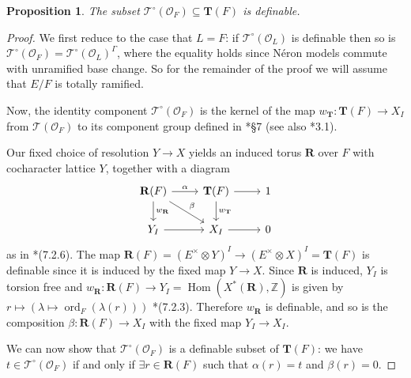 \documentclass{amsart}
\newcommand{\Z}{{\mathbb Z}}
\newcommand{\ri}{\mathcal{O}}
\DeclareMathOperator{\ord}{ord}
\DeclareMathOperator{\Hom}{Hom}
\newcommand{\bT}{\mathbf {T}}
\newcommand{\bR}{\mathbf{R}}
\newcommand{\Ner}[1]{\mathcal{#1}}
\newcommand{\NerC}[1]{\mathcal{#1}^\circ}
\theoremstyle{plain}
\newtheorem{prop}[thm]{Proposition}
\theoremstyle{definition}
\begin{document}
\begin{prop} \label{prop:NerCdefinable}
The subset $\NerC{T}(\ri_F) \subseteq \bT(F)$ is definable.
\end{prop}
\begin{proof}
We first reduce to the case that $L = F$: if $\NerC{T}(\ri_L)$ is definable then so is
$\NerC{T}(\ri_F) = \NerC{T}(\ri_L)^\Gamma$, where the equality holds since N\'eron models commute with unramified base change.
So for the remainder of the proof we will assume that $E/F$ is totally ramified.

Now, the identity component $\NerC{T}(\ri_F)$ is the kernel of the map $w_\bT : \bT(F) \to X_I$ from
$\Ner{T}(\ri_F)$ to its component group  defined in \cite{kottwitz:isocrystals-2}*{\S 7} (see also \cite{bitan:11a}*{3.1}).

Our fixed choice of resolution $Y \to X$ yields an induced torus $\bR$ over $F$ with cocharacter lattice $Y$, together with a diagram
\[
\begin{tikzcd}
\bR(F) \rar{\alpha} \dar{w_{\bR}} \drar{\beta} & \bT(F) \rar \dar{w_{\bT}} & 1 \\
Y_I \rar & X_I \rar & 0
\end{tikzcd}
\]
as in \cite{kottwitz:isocrystals-2}*{(7.2.6)}.  The map $\bR(F) = (E^\times \otimes Y)^I \to (E^\times \otimes X)^I = \bT(F)$
is definable since it is induced by the fixed map $Y \to X$.  Since $\bR$ is induced,
$Y_I$ is torsion free and $w_\bR : \bR(F) \to Y_I = \Hom(X^\ast(\bR), \Z)$ is given by
$r \mapsto \left(\lambda \mapsto \ord_{F}(\lambda(r))\right)$ \cite{kottwitz:isocrystals-2}*{(7.2.3)}.
Therefore $w_\bR$ is definable, and so is the composition $\beta : \bR(F) \to X_I$ with the fixed map $Y_I \to X_I$.

We can now show that $\NerC{T}(\ri_F)$ is a definable subset of $\bT(F)$: we have $t \in \NerC{T}(\ri_F)$
if and only if $\exists r \in \bR(F)$ such that $\alpha(r) = t$ and $\beta(r) = 0$.
\end{proof}
\end{document}
